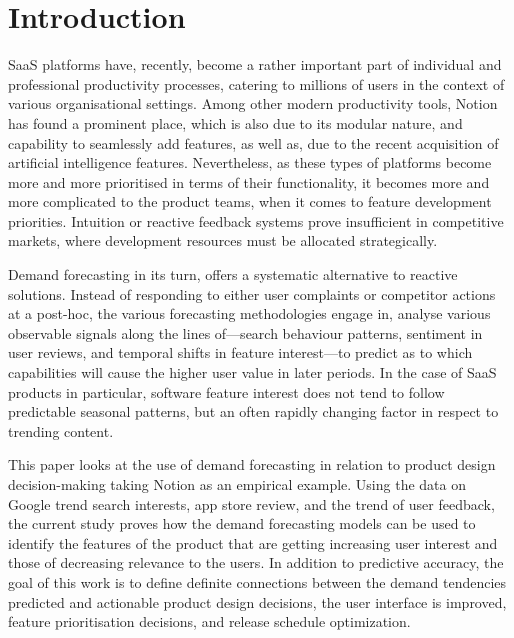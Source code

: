 \section{Introduction}

SaaS platforms have, recently, become a rather important part of individual and professional productivity processes, catering to millions of users in the context of various organisational settings. Among other modern productivity tools, Notion has found a prominent place, which is also due to its modular nature, and capability to seamlessly add features, as well as, due to the recent acquisition of artificial intelligence features. Nevertheless, as these types of platforms become more and more prioritised in terms of their functionality, it becomes more and more complicated to the product teams, when it comes to feature development priorities. Intuition or reactive feedback systems prove insufficient in competitive markets, where development resources must be allocated strategically.

Demand forecasting in its turn, offers a systematic alternative to reactive solutions. Instead of responding to either user complaints or competitor actions at a post-hoc, the various forecasting methodologies engage in, analyse various observable signals along the lines of---search behaviour patterns, sentiment in user reviews, and temporal shifts in feature interest---to predict as to which capabilities will cause the higher user value in later periods. In the case of SaaS products in particular, software feature interest does not tend to follow predictable seasonal patterns, but an often rapidly changing factor in respect to trending content.

This paper looks at the use of demand forecasting in relation to product design decision-making taking Notion as an empirical example. Using the data on Google trend search interests, app store review, and the trend of user feedback, the current study proves how the demand forecasting models can be used to identify the features of the product that are getting increasing user interest and those of decreasing relevance to the users. In addition to predictive accuracy, the goal of this work is to define definite connections between the demand tendencies predicted and actionable product design decisions, the user interface is improved, feature prioritisation decisions, and release schedule optimization.

